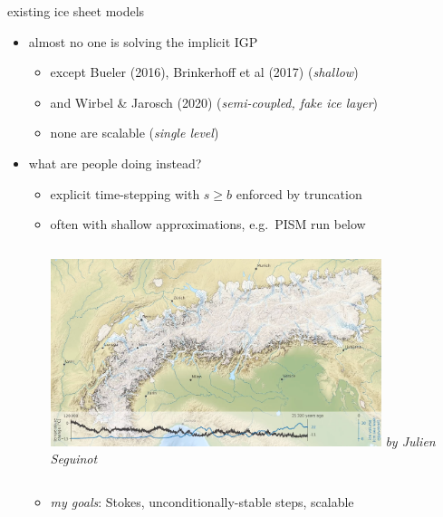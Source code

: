 \documentclass[usepdftitle=false,usenames,dvipsnames]{beamer}
\begin{document}
\begin{frame}{existing ice sheet models}

\begin{itemize}
\item almost no one is solving the implicit IGP
    \begin{itemize}
    \item except Bueler (2016), Brinkerhoff et al (2017) (\emph{shallow})
    \item and Wirbel \& Jarosch (2020) (\emph{semi-coupled, fake ice layer})
    \item none are scalable (\emph{single level})
    \end{itemize}
\item what are people doing instead?
    \begin{itemize}
    \item \alert{explicit time-stepping with $s \ge b$ enforced by truncation}
    \item often with shallow approximations, e.g.~PISM run below

\medskip
\begin{columns}
        \includegraphics[width=0.8\textwidth]{figs/seguinot.png}
        \scriptsize \emph{by Julien Seguinot}
\end{columns}

\medskip
    \item \emph{my goals}: Stokes, unconditionally-stable steps, scalable
    \end{itemize}
\end{itemize}
\end{frame}
\end{document}
